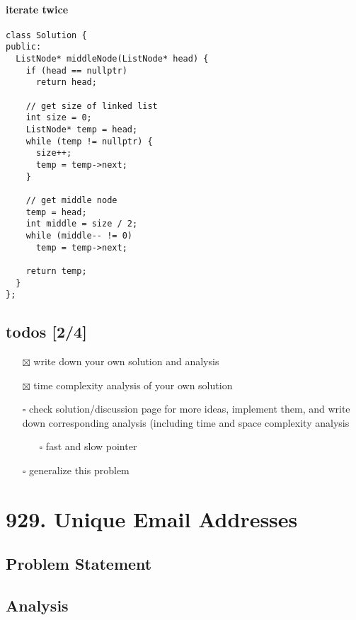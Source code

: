 \documentclass[11pt]{article}
\begin{document}
\paragraph{iterate twice}
\label{sec:orgc0bae7e}
\begin{verbatim}
class Solution {
public:
  ListNode* middleNode(ListNode* head) {
    if (head == nullptr)
      return head;

    // get size of linked list
    int size = 0;
    ListNode* temp = head;
    while (temp != nullptr) {
      size++;
      temp = temp->next;
    }

    // get middle node
    temp = head;
    int middle = size / 2;
    while (middle-- != 0)
      temp = temp->next;

    return temp;
  }
};
\end{verbatim}
\subsection{todos [2/4]}
\label{sec:orga052911}
\begin{itemize}
\item[{$\boxtimes$}] write down your own solution and analysis
\item[{$\boxtimes$}] time complexity analysis of your own solution
\item[{$\square$}] check solution/discussion page for more ideas, implement them, and write down corresponding analysis (including time and space complexity analysis
\begin{itemize}
\item[{$\square$}] fast and slow pointer
\end{itemize}
\item[{$\square$}] generalize this problem
\end{itemize}
\section{929. Unique Email Addresses}
\label{sec:orgd4ac4f9}
\subsection{Problem Statement}
\label{sec:org4d3509f}
\subsection{Analysis}
\label{sec:org0755f60}
\end{document}
